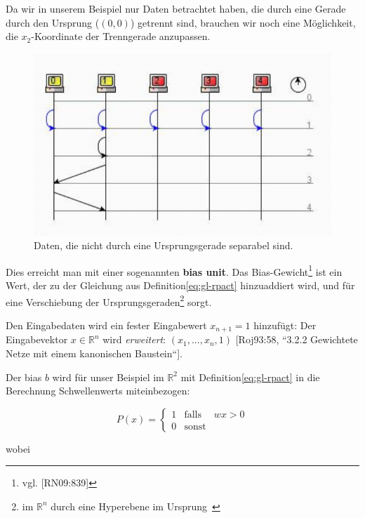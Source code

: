 Da wir in unserem Beispiel nur Daten betrachtet haben, die durch eine Gerade durch den Ursprung ($(0,0)$) getrennt sind, brauchen wir noch eine Möglichkeit, die $x_2$-Koordinate der Trenngerade anzupassen.


\begin{figure}[h]
    \centering
    \includegraphics{images/p1ReadSeq.pdf}
    \caption{Daten, die nicht durch eine Ursprungsgerade separabel sind.}
    \label{fig-nichtseparierbar}
\end{figure}

\noindent
Dies erreicht man mit einer sogenannten \textbf{bias unit}.
Das Bias-Gewicht\footnote{
    vgl. [RN09:839]
} ist ein Wert, der zu der Gleichung aus Definition\ref{eq:gl-rpact} hinzuaddiert wird, und für eine Verschiebung der Ursprungsgeraden\footnote{
    im $ \mathbb{R}^n$ durch eine Hyperebene im Ursprung~\cite[215]{Ert21a}
} sorgt.

Den Eingabedaten wird ein fester Eingabewert $x_{n+1} = 1$ hinzufügt: Der Eingabevektor $x \in  \mathbb{R}^n$ wird \textit{erweitert}: $(x_1, ..., x_n, 1)$ [Roj93:58, ``3.2.2 Gewichtete Netze mit einem kanonischen Baustein``].

\noindent
Der bias $b$ wird für unser Beispiel im $ \mathbb{R}^2$ mit Definition\ref{eq:gl-rpact} in die Berechnung Schwellenwerts miteinbezogen:

\begin{equation}
P(x) = \begin{cases}
            1 &\text{falls} &wx > 0 \\
            0 &\text{sonst}
\end{cases}
\end{equation}

\noindent
wobei

